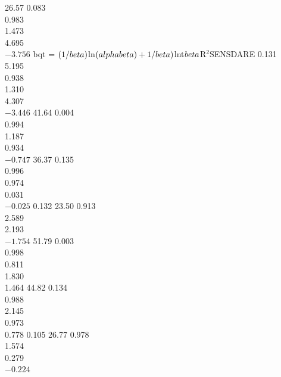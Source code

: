 \documentclass[final,5p,times,twocolumn,authoryear]{elsarticle}
\begin{document}
26.57
0.083\\
0.983\\
1.473\\
4.695\\
$-3.756$
bqt = $(1/\\beta)$ln$(\\alpha\\beta)+1/\\beta)$lnt$\\beta$R$^2$SENSDARE
0.131\\
5.195\\
0.938\\
1.310\\
4.307\\
$-3.446$
41.64
0.004\\
0.994\\
1.187\\
0.934\\
$-0.747$
36.37
0.135\\
0.996\\
0.974\\
0.031\\
$-0.025$
0.132
23.50
0.913\\
2.589\\
2.193\\
$-1.754$
51.79
0.003\\
0.998\\
0.811\\
1.830\\
1.464
44.82
0.134\\
0.988\\
2.145\\
0.973\\
0.778
0.105
26.77
0.978\\
1.574\\
0.279\\
$-0.224$
\end{document}
